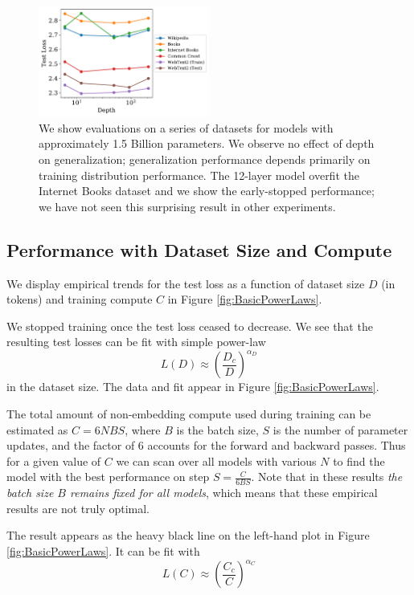\documentclass[english]{article}
\newcommand{\be}{\begin{equation}}
\newcommand{\ee}{\end{equation}}
\begin{document}
\begin{figure}
\noindent \centering{}
\includegraphics[width=0.5\textwidth]{DepthVsGeneralization}
\caption[Generalization versus depth]{We show evaluations on a series of datasets for models with approximately 1.5 Billion parameters.  We observe no effect of depth on generalization; generalization performance depends primarily on training distribution performance. The 12-layer model overfit the Internet Books dataset and we show the early-stopped performance; we have not seen this surprising result in other experiments. \label{fig:DepthVsGeneralization}}
\end{figure}

\subsection{Performance with Dataset Size and Compute}

We display empirical trends for the test loss as a function of dataset size $D$ (in tokens) and training compute $C$ in Figure \ref{fig:BasicPowerLaws}.    

We stopped training once the test loss ceased to decrease.  We see that the resulting test losses can be fit with simple power-law
\be
L(D) \approx \left( \frac{D_c}{D} \right)^{\alpha_D}
\ee
in the dataset size.  The data and fit appear in Figure \ref{fig:BasicPowerLaws}.

The total amount of non-embedding compute used during training can be estimated as $C = 6 N B S$, where $B$ is the batch size, $S$ is the number of parameter updates, and the factor of $6$ accounts for the forward and backward passes.  Thus for a given value of $C$ we can scan over all models with various $N$ to find the model with the best performance on step $S = \frac{C}{6 B S}$.  Note that in these results \emph{the batch size $B$ remains fixed for all models}, which means that these empirical results are not truly optimal.

The result appears as the heavy black line on the left-hand plot in Figure \ref{fig:BasicPowerLaws}.  It can  be fit with 
\be
L(C) \approx \left( \frac{C_c}{C} \right)^{\alpha_C}
\ee
\end{document}
